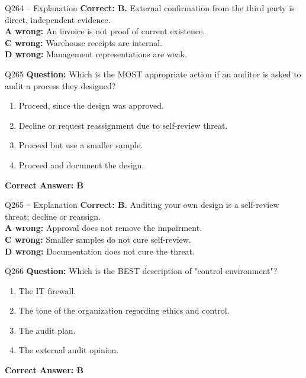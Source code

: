 \documentclass[aspectratio=169,10pt]{beamer}
\begin{document}
	\begin{frame}[t]{Q264 -- Explanation}
		\small
		\textbf{Correct: B.} External confirmation from the third party is direct, independent evidence. \\[4pt]
		\textbf{A wrong:} An invoice is not proof of current existence. \\[2pt]
		\textbf{C wrong:} Warehouse receipts are internal. \\[2pt]
		\textbf{D wrong:} Management representations are weak.
	\end{frame}
	
	\begin{frame}[t]{Q265}
		\small
		\textbf{Question:} Which is the MOST appropriate action if an auditor is asked to audit a process they designed?
		\begin{enumerate}[label=\Alph*.,itemsep=1pt,topsep=2pt]
			\item Proceed, since the design was approved.
			\item Decline or request reassignment due to self-review threat.
			\item Proceed but use a smaller sample.
			\item Proceed and document the design.
		\end{enumerate}
		\vspace{4pt}
		\textbf{Correct Answer: B}
	\end{frame}
	
	\begin{frame}[t]{Q265 -- Explanation}
		\small
		\textbf{Correct: B.} Auditing your own design is a self-review threat; decline or reassign. \\[4pt]
		\textbf{A wrong:} Approval does not remove the impairment. \\[2pt]
		\textbf{C wrong:} Smaller samples do not cure self-review. \\[2pt]
		\textbf{D wrong:} Documentation does not cure the threat.
	\end{frame}
	
	\begin{frame}[t]{Q266}
		\small
		\textbf{Question:} Which is the BEST description of "control environment"?
		\begin{enumerate}[label=\Alph*.,itemsep=1pt,topsep=2pt]
			\item The IT firewall.
			\item The tone of the organization regarding ethics and control.
			\item The audit plan.
			\item The external audit opinion.
		\end{enumerate}
		\vspace{4pt}
		\textbf{Correct Answer: B}
	\end{frame}
	
\end{document}
